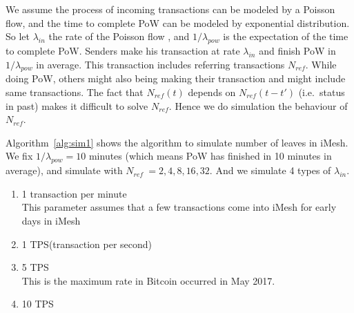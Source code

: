 \documentclass[a4paper,10pt,twocolumn]{article}
\begin{document}
We assume the process of incoming transactions can be modeled by a Poisson flow, and the time to  complete PoW can be modeled by exponential distribution.
So let \(\lambda_{in}\) the rate of the Poisson flow , and \(1 / \lambda_{pow}\) is the expectation of the time to complete PoW.
Senders make his transaction at rate \(\lambda_{in}\)  and finish PoW in  \(1/\lambda_{pow}\) in average.
This transaction includes referring transactions \( N_{ref}\).
While doing PoW, others might also being making their transaction and might include same transactions.
The fact that  \( N_{ref} (t) \)  depends on  \( N_{ref} (t-t')\) (i.e.\ status in past) makes it difficult 
to solve \( N_{ref}\). Hence we do simulation the behaviour of \( N_{ref}\).

Algorithm~\ref{alg:sim1}  shows the algorithm to simulate number of leaves in iMesh.
We fix  \(1 / \lambda_{pow} = 10 \) minutes (which means PoW has finished in 10 minutes
in average), and simulate with \(N_{ref}\ = 2, 4, 8, 16, 32 \).
And we simulate 4 types of  \(\lambda_{in} \).

\vspace{-0.5\baselineskip}
\begin{enumerate}
	\setlength\itemsep{0em}
\item 1 transaction per minute \\
 This parameter assumes that a few transactions come into iMesh for
early days in iMesh
\item 1 TPS(transaction per second)
\item 5 TPS \\
 This is the maximum rate in Bitcoin occurred in May 2017.
 \item 10 TPS
\end{enumerate}
\end{document}
